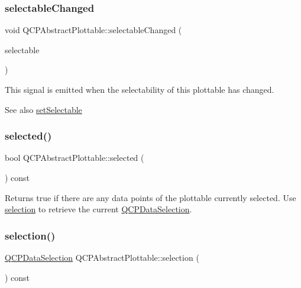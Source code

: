 \subsubsection{\texorpdfstring{selectable\+Changed}{selectableChanged}}
{\footnotesize\ttfamily void Q\+C\+P\+Abstract\+Plottable\+::selectable\+Changed (\begin{DoxyParamCaption}\item[{\hyperlink{namespace_q_c_p_ac6cb9db26a564b27feda362a438db038}{Q\+C\+P\+::\+Selection\+Type}}]{selectable }\end{DoxyParamCaption})\hspace{0.3cm}{\ttfamily [signal]}}

This signal is emitted when the selectability of this plottable has changed.

\begin{DoxySeeAlso}{See also}
\hyperlink{class_q_c_p_abstract_plottable_ac238d6e910f976f1f30d41c2bca44ac3}{set\+Selectable} 
\end{DoxySeeAlso}
\mbox{\label{class_q_c_p_abstract_plottable_a0b3b514474fe93354fc74cfc144184b4}} 
\subsubsection{\texorpdfstring{selected()}{selected()}}
{\footnotesize\ttfamily bool Q\+C\+P\+Abstract\+Plottable\+::selected (\begin{DoxyParamCaption}{ }\end{DoxyParamCaption}) const\hspace{0.3cm}{\ttfamily [inline]}}

Returns true if there are any data points of the plottable currently selected. Use \hyperlink{class_q_c_p_abstract_plottable_a040bf09f41d456284cfd39cc37aa068f}{selection} to retrieve the current \hyperlink{class_q_c_p_data_selection}{Q\+C\+P\+Data\+Selection}. \mbox{\label{class_q_c_p_abstract_plottable_a040bf09f41d456284cfd39cc37aa068f}} 
\subsubsection{\texorpdfstring{selection()}{selection()}}
{\footnotesize\ttfamily \hyperlink{class_q_c_p_data_selection}{Q\+C\+P\+Data\+Selection} Q\+C\+P\+Abstract\+Plottable\+::selection (\begin{DoxyParamCaption}{ }\end{DoxyParamCaption}) const\hspace{0.3cm}{\ttfamily [inline]}}

